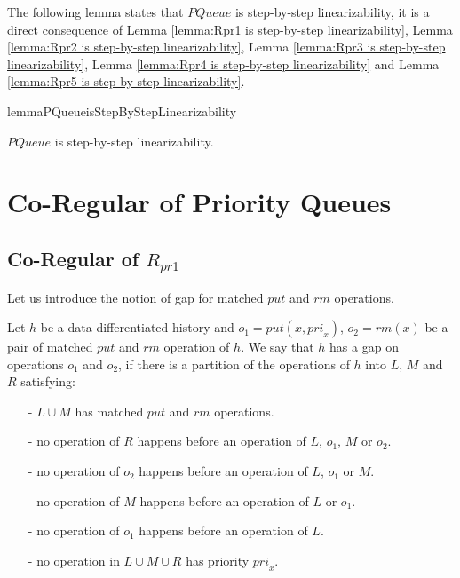 The following lemma states that $\textit{PQueue}$ is step-by-step linearizability, it is a direct consequence of Lemma \ref{lemma:Rpr1 is step-by-step linearizability}, Lemma \ref{lemma:Rpr2 is step-by-step linearizability}, Lemma \ref{lemma:Rpr3 is step-by-step linearizability}, Lemma \ref{lemma:Rpr4 is step-by-step linearizability} and Lemma \ref{lemma:Rpr5 is step-by-step linearizability}.


\begin{restatable}{lemma}{PQueueisStepByStepLinearizability}
\label{lemma:PQueue is step-by-step linearizability}

$\textit{PQueue}$ is step-by-step linearizability.

\end{restatable}




\section{Co-Regular of Priority Queues}
\label{sec:co-regular of priority queues}




\subsection{Co-Regular of $R_{\textit{pr1}}$}
\label{subsec:co-regular of Rpr1}

Let us introduce the notion of gap for matched $\textit{put}$ and $\textit{rm}$ operations.

\begin{definition}\label{def:gap for matched put and rm operations}

Let $h$ be a data-differentiated history and $o_1 = \textit{put}(x,\textit{pri}_x)$, $o_2 = \textit{rm}(x)$ be a pair of matched $\textit{put}$ and $\textit{rm}$ operation of $h$. We say that $h$ has a gap on operations $o_1$ and $o_2$, if there is a partition of the operations of $h$ into $L$, $M$ and $R$ satisfying:
\begin{itemize}
\setlength{\itemsep}{0.5pt}
\item[-] $L \cup M$ has matched $\textit{put}$ and $\textit{rm}$ operations.

\item[-] no operation of $R$ happens before an operation of $L$, $o_1$, $M$ or $o_2$.

\item[-] no operation of $o_2$ happens before an operation of $L$, $o_1$ or $M$.

\item[-] no operation of $M$ happens before an operation of $L$ or $o_1$.

\item[-] no operation of $o_1$ happens before an operation of $L$.

\item[-] no operation in $L \cup M \cup R$ has priority $\textit{pri}_x$.
\end{itemize}
\end{definition}

